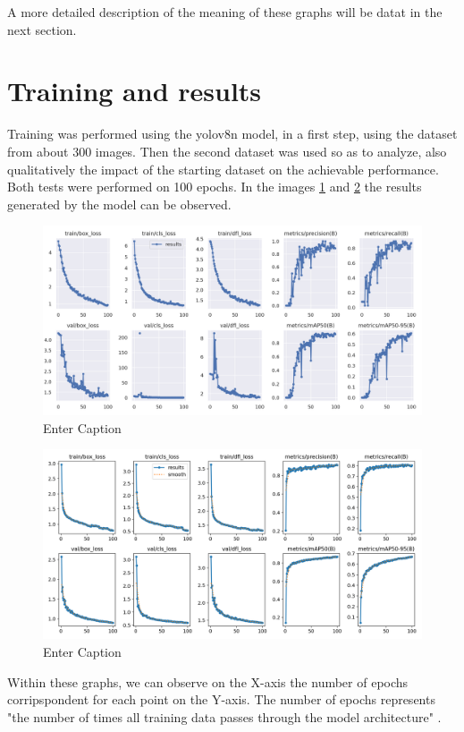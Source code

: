 \documentclass[12pt]{article}
\begin{document}
A more detailed description of the meaning of these graphs will be datat in the next section.

\section{Training and results}
Training was performed using the yolov8n model, in a first step, using the dataset from about 300 images. Then the second dataset was used so as to analyze, also qualitatively the impact of the starting dataset on the achievable performance. Both tests were performed on 100 epochs. In the images \ref{fig:mesh3} and \ref{fig:mesh4} the results generated by the model can be observed.
\begin{figure}[H]
    \centering
    \includegraphics[width=1\linewidth]
    {results_training_small.png}
    \caption{Enter Caption}
    \label{fig:mesh3}
\end{figure}
\begin{figure}[H]
    \centering
    \includegraphics[width=1\linewidth]
    {results_training_big.png}
    \caption{Enter Caption}
    \label{fig:mesh4}
\end{figure}
Within these graphs, we can observe on the X-axis the number of epochs corripspondent for each point on the Y-axis. The number of epochs represents "the number of times all training data passes through the model architecture" \cite{yolo2}.
\end{document}
